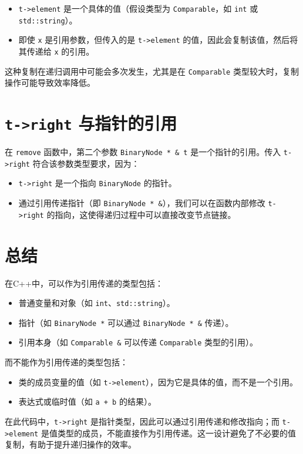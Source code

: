 \documentclass{article}
\begin{document}
\begin{itemize}
    \item \texttt{t->element} 是一个具体的值（假设类型为 \texttt{Comparable}，如 \texttt{int} 或 \texttt{std::string}）。
    \item 即使 \texttt{x} 是引用参数，但传入的是 \texttt{t->element} 的值，因此会复制该值，然后将其传递给 \texttt{x} 的引用。
\end{itemize}

这种复制在递归调用中可能会多次发生，尤其是在 \texttt{Comparable} 类型较大时，复制操作可能导致效率降低。

\section{\texttt{t->right} 与指针的引用}
在 \texttt{remove} 函数中，第二个参数 \texttt{BinaryNode * \& t} 是一个指针的引用。传入 \texttt{t->right} 符合该参数类型要求，因为：

\begin{itemize}
    \item \texttt{t->right} 是一个指向 \texttt{BinaryNode} 的指针。
    \item 通过引用传递指针（即 \texttt{BinaryNode * \&}），我们可以在函数内部修改 \texttt{t->right} 的指向，这使得递归过程中可以直接改变节点链接。
\end{itemize}

\section{总结}
在C++中，可以作为引用传递的类型包括：
\begin{itemize}
    \item 普通变量和对象（如 \texttt{int}、\texttt{std::string}）。
    \item 指针（如 \texttt{BinaryNode *} 可以通过 \texttt{BinaryNode * \&} 传递）。
    \item 引用本身（如 \texttt{Comparable \&} 可以传递 \texttt{Comparable} 类型的引用）。
\end{itemize}

而不能作为引用传递的类型包括：
\begin{itemize}
    \item 类的成员变量的值（如 \texttt{t->element}），因为它是具体的值，而不是一个引用。
    \item 表达式或临时值（如 \texttt{a + b} 的结果）。
\end{itemize}

在此代码中，\texttt{t->right} 是指针类型，因此可以通过引用传递和修改指向；而 \texttt{t->element} 是值类型的成员，不能直接作为引用传递。这一设计避免了不必要的值复制，有助于提升递归操作的效率。
\end{document}
